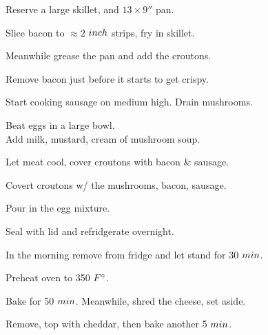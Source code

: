 \begin{preparation}
\item Reserve a large skillet, and $13\times9''$ pan.

\item Slice bacon to $\approx2$ $\inch$ strips, fry in skillet.

\item Meanwhile grease the pan and add the croutons.

\item Remove bacon just before it starts to get crispy.

\item Start cooking sausage on medium high. Drain mushrooms.

\item Beat eggs in a large bowl.\\
    Add milk, mustard, cream of mushroom soup.

\item Let meat cool, cover croutons with bacon \& sausage.

\item Covert croutons w/ the mushrooms, bacon, sausage.

\item Pour in the egg mixture.

\item Seal with lid and refridgerate overnight.

\item In the morning remove from fridge and let stand for 30 $\minute$.

\item Preheat oven to 350 $\Fahrenheit$.

\item Bake for 50 $\minute$.
    Meanwhile, shred the cheese, set aside.

\item Remove, top with cheddar, then bake another 5 $\minute$.
\end{preparation}

\recipeend%
